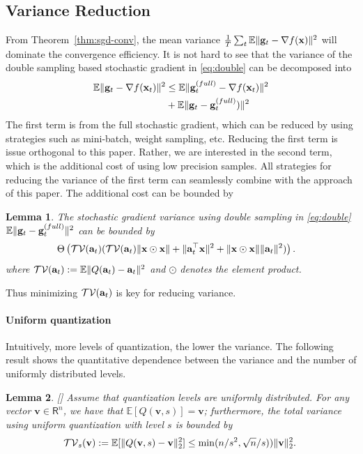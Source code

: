 \documentclass{article}
\newcommand{\R}{\mathsf{R}}
\renewcommand{\vec}[1]{\mathbf{#1}}
\def\a{{\bf a}}
\def\g{{\bf g}}
\def\x{{\bf x}}
\def\v{{\bf v}}
\def\E{\mathbb{E}}
\newtheorem{lemma}{Lemma}
\begin{document}
\subsection{Variance Reduction}
\vspace{-0.5em}

From Theorem~\ref{thm:sgd-conv}, the mean variance ${1\over T}\sum_{t}\E\|\g_t - \nabla f(\x)\|^2$ will dominate the convergence efficiency. It is not hard to see that the variance of the double sampling based stochastic gradient in \eqref{eq:double} can be decomposed into
\vspace{-0.5em}
\begin{align*}
\E\|\g_t - \nabla f(\x_t)\|^2 & \leq \E \|\g_t^{(full)}- \nabla f(\x_t)\|^2 
\\
&+ \E \|\g_t - \g_t^{(full)})\|^2
\end{align*}
The first term is from the full stochastic gradient, which can be reduced by using strategies such as mini-batch, weight sampling, etc. Reducing the first term is issue orthogonal to this paper. 
Rather, we are interested in the second term, which is the additional cost of using low precision samples. All strategies for reducing the variance of the first term can seamlessly combine with the approach of this paper. 
The additional cost can be bounded by
\begin{lemma} 
The stochastic gradient variance using double sampling in \eqref{eq:double} $\E\|\g_t - \g_t^{(full)}\|^2$ can be bounded by
\begin{align*}
&\Theta\left(\mathcal{TV}(\a_t) (\mathcal{TV}(\a_t)\|\x\odot \x\| + \|\a_t^\top \x\|^2 + \|\x\odot \x\|\|\a_t\|^2)\right).
\end{align*}
where $\mathcal{TV}(\a_t) := \E\|Q(\a_t) - \a_t\|^2$ and $\odot$ denotes the element product.
\end{lemma}
Thus minimizing $\mathcal{TV}(\a_t)$ is key for reducing variance. 

\vspace{-0.5em}
\paragraph{Uniform quantization} Intuitively, more levels of quantization, the lower the variance. The following result shows the quantitative dependence between the variance and the number of uniformly distributed levels. 

\begin{lemma}
\label{lem:quant-facts} [\cite{Alistarh:2016:ArXiv}]
Assume that quantization levels are uniformly distributed. For any vector $\vec{v} \in \R^n$, we have that $\E [Q (\vec{v},s)] = \vec{v}$; furthermore, the total variance using uniform quantization with level $s$ is bounded by
\[
\mathcal{TV}_s(\v):=\E [\| Q (\vec{v},s) - \v\|_2^2] \leq \min( n/s^2,\sqrt{n}/s)) \| \vec{v} \|_2^2. \;
\]
\end{lemma} 
\end{document}
